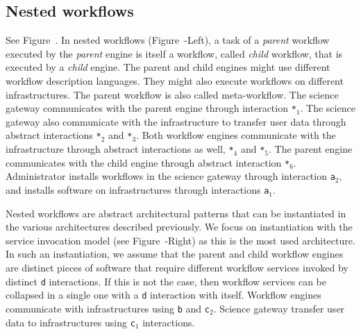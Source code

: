\documentclass[preprint,3p,twocolumn]{elsarticle}
\begin{document}
\subsection{Nested workflows}

See Figure~. In nested workflows
(Figure~-Left), a task of a \emph{parent} workflow
executed by the \emph{parent} engine is itself a workflow, called
\emph{child} workflow, that is executed by a \emph{child} engine. The
parent and child engines might use different workflow description
languages. They might also execute workflows on different
infrastructures. The parent workflow is also called meta-workflow. The
science gateway communicates with the parent engine through
interaction \texttt{*$_1$}. The science gateway also communicate with
the infrastructure to transfer user data through abstract interactions
\texttt{*$_2$} and \texttt{*$_3$}. Both workflow engines communicate
with the infrastructure through abstract interactions as well,
\texttt{*$_4$} and \texttt{*$_5$}. The parent engine communicates with
the child engine through abstract interaction
\texttt{*$_6$}. Administrator installs workflows in the science
gateway through interaction \texttt{a$_2$}, and installs software on
infrastructures through interactions \texttt{a$_1$}.

Nested workflows are abstract architectural patterns that can be
instantiated in the various architectures described previously. We
focus on instantiation with the service invocation model (see
Figure~-Right) as this is the most used
architecture. In such an instantiation, we assume that the parent and
child workflow engines are distinct pieces of software that require
different workflow services invoked by distinct \texttt{d}
interactions. If this is not the case, then workflow services can be
collapsed in a single one with a \texttt{d} interaction with
itself. Workflow engines communicate with infrastructures using
\texttt{b} and \texttt{c$_2$}. Science gateway transfer user data to
infrastructures using \texttt{c$_1$} interactions.
\end{document}
